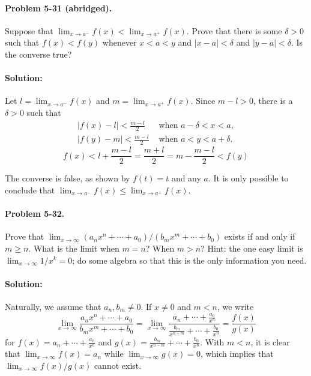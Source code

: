 \documentclass{article}
\begin{document}
\paragraph{Problem 5-31 (abridged).} Suppose that $\lim_{x \rightarrow a^-}f(x)
< \lim_{x \rightarrow a^+}f(x)$. Prove that there is some $\delta > 0$ such
that $f(x) < f(y)$ whenever $x < a < y$ and $|x - a| < \delta$ and $|y - a| <
\delta$. Is the converse true?

\paragraph{Solution:} Let $l = \lim_{x \rightarrow a^-}f(x)$ and $m = \lim_{x
\rightarrow a^+}f(x)$. Since $m - l > 0$, there is a $\delta > 0$ such that
\begin{align*}
  |f(x) - l| < \frac{m - l}{2} &\text{ when } a - \delta < x < a, \\
  |f(y) - m| < \frac{m - l}{2} &\text{ when } a < y < a + \delta.
\end{align*}
\begin{equation*}
  f(x) < l + \frac{m - l}{2} = \frac{m + l}{2} = m - \frac{m - l}{2} < f(y)
\end{equation*}

The converse is false, as shown by $f(t) = t$ and any $a$. It is only possible
to conclude that $\lim_{x \rightarrow a^-}f(x) \leq \lim_{x \rightarrow a^+}
f(x)$.

\paragraph{Problem 5-32.} Prove that $\lim_{x \rightarrow \infty}(a_nx^n +
\cdots + a_0)/(b_mx^m + \cdots + b_0)$ exists if and only if $m \geq n$. What
is the limit when $m = n$? When $m > n$? Hint: the one easy limit is $\lim_{x
\rightarrow \infty}1/x^k = 0$; do some algebra so that this is the only
information you need.

\paragraph{Solution:} Naturally, we assume that $a_n, b_m \neq 0$. If $x \neq
0$ and $m < n$, we write \begin{equation*}
  \lim_{x \rightarrow \infty}\frac{a_nx^n + \cdots + a_0}{b_mx^m + \cdots + b_0
    } = \lim_{x \rightarrow \infty}\frac{a_n + \cdots + \frac{a_0}{x^n}}{\frac{
    b_m}{x^{n - m}} + \cdots + \frac{b_0}{x^n}} = \frac{f(x)}{g(x)}
\end{equation*} for $f(x) = a_n + \cdots + \frac{a_0}{x^n}$ and $g(x) = \frac{
b_m}{x^{n - m}} + \cdots + \frac{b_0}{x^n}$. With $m < n$, it is clear that
$\lim_{x \rightarrow \infty}f(x) = a_n$ while $\lim_{x \rightarrow \infty}g(x)
= 0$, which implies that $\lim_{x \rightarrow \infty}f(x)/g(x)$ cannot exist.
\end{document}
